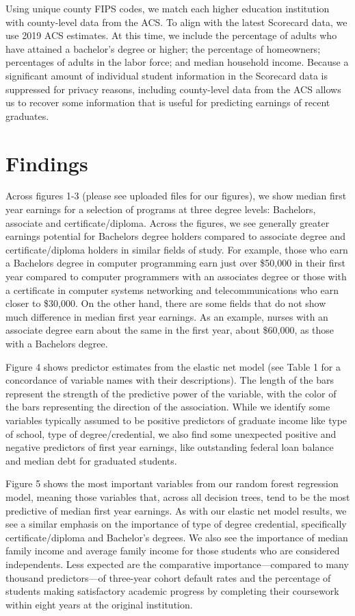 \documentclass[a4paper, 12pt]{article}
\begin{document}
Using unique county FIPS codes, we match each higher education institution with county-level data from the ACS. To align with the latest Scorecard data, we use 2019 ACS estimates. At this time, we include the percentage of adults who have attained a bachelor's degree or higher; the percentage of homeowners; percentages of adults in the labor force; and median household income. Because a significant amount of individual student information in the Scorecard data is suppressed for privacy reasons, including county-level data from the ACS allows us to recover some information that is useful for predicting earnings of recent graduates.

\section*{Findings}

Across figures 1-3 (please see uploaded files for our figures), we show median first year earnings for a selection of programs at three degree levels: Bachelors, associate and certificate/diploma. Across the figures, we see generally greater earnings potential for Bachelors degree holders compared to associate degree and certificate/diploma holders in similar fields of study. For example, those who earn a Bachelors degree in computer programming earn just over \$50,000 in their first year compared to computer programmers with an associates degree or those with a certificate in computer systems networking and telecommunications who earn closer to \$30,000. On the other hand, there are some fields that do not show much difference in median first year earnings. As an example, nurses with an associate degree earn about the same in the first year, about \$60,000, as those with a Bachelors degree.

Figure 4 shows predictor estimates from the elastic net model (see Table 1 for a concordance of variable names with their descriptions). The length of the bars represent the strength of the predictive power of the variable, with the color of the bars representing the direction of the association. While we identify some variables typically assumed to be positive predictors of graduate income like type of school, type of degree/credential, we also find some unexpected positive and negative predictors of first year earnings, like outstanding federal loan balance and median debt for graduated students.

Figure 5 shows the most important variables from our random forest regression model, meaning those variables that, across all decision trees, tend to be the most predictive of median first year earnings. As with our elastic net model results, we see a similar emphasis on the importance of type of degree credential, specifically certificate/diploma and Bachelor's degrees. We also see the importance of median family income and average family income for those students who are considered independents. Less expected are the comparative importance---compared to many thousand predictors---of three-year cohort default rates and the percentage of students making satisfactory academic progress by completing their coursework within eight years at the original institution.
\end{document}
